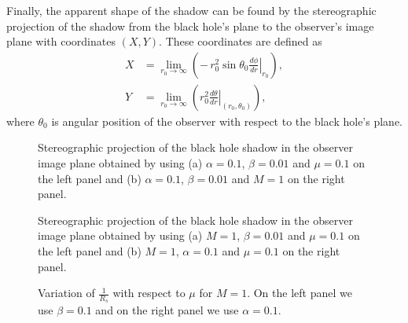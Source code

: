 \documentclass[aps,amsmath,amssymb,showpacs,showkeys]{revtex4}
\begin{document}
Finally, the apparent shape of the shadow can be found by the stereographic 
projection of the shadow from the black hole's plane to the observer's image
plane with coordinates $(X,Y)$. These coordinates are defined as \cite{shnew03} 
\begin{align}
 X & =\lim_{r_{0}\rightarrow\infty}\left(-\,r_{0}^{2}\sin\theta_{0}\left.\frac{d\phi}{dr}\right|_{r_{0}}\right),\\[5pt]
Y & =\lim_{r_{0}\rightarrow\infty}\left(r_{0}^{2}\left.\frac{d\theta}{dr}\right|_{(r_{0},\theta_{0})}\right),
\end{align}
where $\theta_{0}$ is angular position of the observer with respect to the 
black hole's plane. 
\begin{figure}[h!]
\vspace{0.5cm}
\caption{Stereographic projection of the black hole shadow in the observer 
image plane obtained by using (a) $\alpha = 0.1$, $\beta = 0.01$ and 
$\mu=0.1$ on the left panel and (b) $\alpha = 0.1$, $\beta = 0.01$ and 
$M=1$ on the right panel.}
\label{Shadow01}
\end{figure}

\begin{figure}[h!]
\caption{Stereographic projection of the black hole shadow in the observer 
image plane obtained by using (a) $M=1$, $\beta = 0.01$ and $\mu=0.1$ on the 
left panel and (b) $M=1$, $\alpha = 0.1$ and $\mu = 0.1$ on the right panel.}
\label{Shadow02}
\end{figure}

\begin{figure}[h!]
\caption{Variation of $\frac{1}{R_s}$ with respect to $\mu$ for $M=1$. On the 
left panel we use $\beta =0.1$ and on the right panel we use 
$\alpha = 0.1$.}
\label{Shadow03}
\end{figure}
\end{document}

